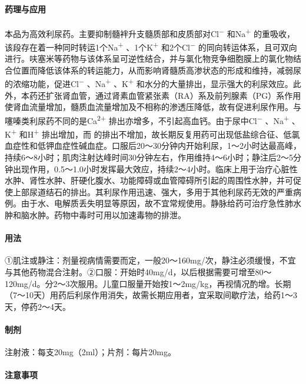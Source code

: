 \paragraph{药理与应用}

本品为高效利尿药。主要抑制髓袢升支髓质部和皮质部对Cl\textsuperscript{−}
和Na\textsuperscript{+}
的重吸收，该段存在着一种同时转运1个Na\textsuperscript{+}
、1个K\textsuperscript{+} 和2个Cl\textsuperscript{−}
的同向转运体系，且可双向进行。呋塞米等药物与该体系呈可逆性结合，并与氯化物竞争细胞膜上的氯化物结合位置而降低该体系的转运能力，从而影响肾髓质高渗状态的形成和维持，减弱尿的浓缩功能，促进Cl\textsuperscript{−}
、Na\textsuperscript{+} 、K\textsuperscript{+}
和水分的大量排出，显示强大的利尿效应。此外，本药还扩张肾血管，通过肾素血管紧张素（RA）系及前列腺素（PG）系作用使肾血流量增加，髓质血流量增加及不相称的渗透压降低，故有促进利尿作用。与噻嗪类利尿药不同的是Ca\textsuperscript{2+}
排出亦增多，不引起高血钙。由于尿中Cl\textsuperscript{−}
、Na\textsuperscript{+} 、K\textsuperscript{+} 和H\textsuperscript{+}
排出增加，而{}
的排出不增加，故长期反复用药可出现低盐综合征、低氯血症性和低钾血症性碱血症。口服后20～30分钟内开始利尿，1～2小时达最高峰，持续6～8小时；肌肉注射达峰时间30分钟左右，作用维持4～6小时；静注后2～5分钟出现作用，0.5～1.0小时发挥最大效应，持续2～4小时。临床上用于治疗心脏性水肿、肾性水肿、肝硬化腹水、功能障碍或血管障碍所引起的周围性水肿，并可促使上部尿道结石的排出。其利尿作用迅速、强大，多用于其他利尿药无效的严重病例。由于水、电解质丢失明显等原因，故不宜常规使用。静脉给药可治疗急性肺水肿和脑水肿。药物中毒时可用以加速毒物的排泄。

\paragraph{用法}

①肌注或静注：剂量视病情需要而定，一般20～160mg/次，静注必须缓慢，不宜与其他药物混合注射。②口服：开始时40mg/d，以后根据需要可增至80～120mg/d。分2～3次服用。儿童口服量开始按1～2mg/kg，再视情况酌增。长期（7～10天）用药后利尿作用消失，故需长期应用者，宜采取间歇疗法，给药1～3天，停药2～4天。

\paragraph{制剂}

注射液：每支20mg（2ml）；片剂：每片20mg。

\paragraph{注意事项}

